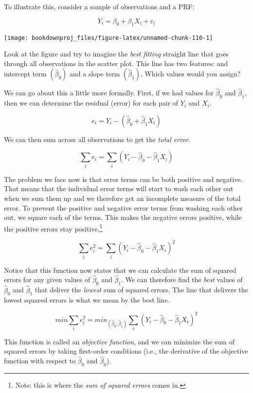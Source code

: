 \documentclass[
]{book}
\begin{document}
To illustrate this, consider a sample of observations and a PRF:

\[Y_i=\beta_0+\beta_1X_i+\varepsilon_i\]

\begin{center}\texttt{[image: bookdownproj\_files/figure-latex/unnamed-chunk-110-1]} \end{center}

Look at the figure and try to imagine the \emph{best fitting} straight line that goes through all observations in the scatter plot. This line has two features: and intercept term \((\hat{\beta}_0)\) and a slope term \((\hat{\beta}_1)\). Which values would you assign?

We can go about this a little more formally. First, if we had values for \(\hat{\beta}_0\) and \(\hat{\beta}_1\), then we can determine the residual (error) for each pair of \(Y_i\) and \(X_i\).

\[e_i = Y_i - (\hat{\beta}_0 + \hat{\beta}_1X_i)\]

We can then sum across all observations to get the \emph{total error}.

\[\sum_{i}e_i = \sum_{i}(Y_i - \hat{\beta}_0 - \hat{\beta}_1X_i)\]

The problem we face now is that error terms can be both positive and negative. That means that the individual error terms will start to wash each other out when we sum them up and we therefore get an incomplete measure of the total error. To prevent the positive and negative error terms from washing each other out, we square each of the terms. This makes the negative errors positive, while the positive errors stay positive.\footnote{Note: this is where the \emph{sum of squared errors} comes in.}

\[\sum_{i}e^2_i = \sum_{i}(Y_i - \hat{\beta}_0 - \hat{\beta}_1X_i)^2\]

Notice that this function now states that we can calculate the sum of squared errors for any given values of \(\hat{\beta}_0\) and \(\hat{\beta}_1\). We can therefore find the \emph{best} values of \(\hat{\beta}_0\) and \(\hat{\beta}_1\) that deliver the \emph{lowest} sum of squared errors. The line that delivers the lowest squared errors is what we mean by the best line.

\[min\sum_{i}e^2_i = min_{(\hat{\beta}_0,\hat{\beta}_1)}\sum_{i}(Y_i - \hat{\beta}_0 - \hat{\beta}_1X_i)^2\]

This function is called an \emph{objective function}, and we can minimize the sum of squared errors by taking first-order conditions (i.e., the derivative of the objective function with respect to \(\hat{\beta}_0\) and \(\hat{\beta}_0\)).
\end{document}

